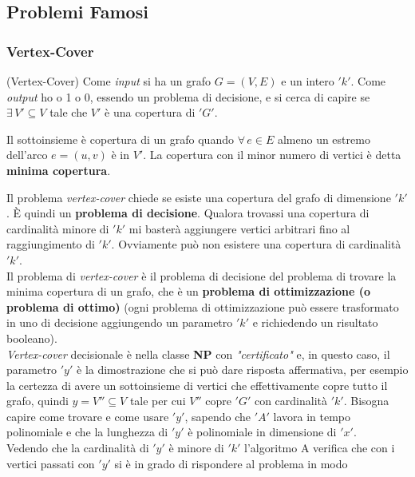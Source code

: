 			\subsection{Problemi Famosi}
			\subsubsection{Vertex-Cover}
			\begin{definizione}(Vertex-Cover)
				Come \textit{input} si ha un grafo
				$G=(V,E)$ e un intero $ 'k' $. Come \textit{output} ho o 1 o 0, essendo un problema di
				decisione, e si cerca di capire se $\exists\, V'\subseteq V$ tale che $V'$ è
				una copertura di $ 'G' $.
				\begin{nota}
					Il sottoinsieme è copertura di un grafo quando
					$\forall\, e\in E$ almeno un estremo dell'arco $e=(u,v)$ è in $V'$. La
					copertura con il minor numero di vertici è detta \textbf{minima copertura}.
				\end{nota}
				Il problema \emph{vertex-cover} chiede se esiste una copertura del grafo di
				dimensione $ 'k' $. È quindi un \textbf{problema di decisione}. Qualora trovassi
				una copertura di cardinalità minore di $ 'k' $ mi basterà aggiungere vertici
				arbitrari fino al raggiungimento di $ 'k' $. Ovviamente può non esistere una
				copertura di cardinalità $ 'k' $.\\
				Il problema di \emph{vertex-cover} è il problema di decisione del problema di
				trovare la minima copertura di un grafo, che è un \textbf{problema di
				ottimizzazione (o problema di ottimo)} (ogni problema di ottimizzazione può
				essere trasformato in uno di decisione aggiungendo un parametro $ 'k' $ e
				richiedendo un risultato booleano).\\
				\emph{Vertex-cover} decisionale è nella classe \textbf{NP} con \textit{"certificato"}
				e, in questo caso, il parametro $ 'y' $ è la dimostrazione che si può dare risposta
				affermativa, per esempio la certezza di avere un sottoinsieme di vertici che
				effettivamente copre tutto il grafo, quindi $y=V''\subseteq V$ tale per cui
				$V''$ copre $ 'G' $ con cardinalità $ 'k' $. Bisogna capire come trovare e come usare
				$ 'y' $, sapendo che $ 'A' $ lavora in tempo polinomiale e che la lunghezza di $ 'y' $ è
				polinomiale in dimensione di $ 'x' $.\\ 
				Vedendo che la cardinalità di $ 'y' $ è minore di $ 'k' $ l'algoritmo A verifica che
				con i vertici passati con $ 'y' $ si è in grado di rispondere al problema in modo

\end{definizione}
